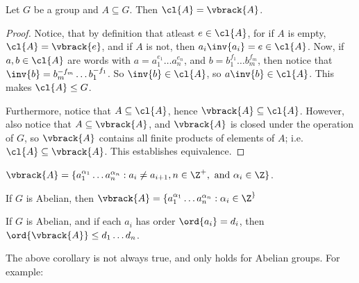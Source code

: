 \begin{lemma}\label{2.4.3}
    Let $G$ be a group and  $A \subseteq G$. Then  $\cl{A}=\vbrack{A}$.
\end{lemma}
\begin{proof}
    Notice, that by definition that atleast $e \in \cl{A}$, for if $A$ is empty,
    $\cl{A}=\vbrack{e}$, and if $A$ is not, then  $a_i\inv{a_i}=e \in \cl{A}$.
    Now, if $a,b \in \cl{A}$ are words with $a=a_1^{e_1} \dots a_n^{e_n}$, and
    $b=b_1^{f_1} \dots b_m^{f_m}$, then notice that $\inv{b}=b_m^{-f_m} \dots
    b_1^{-f_1}$. So $\inv{b} \in \cl{A}$, so $a\inv{b} \in \cl{A}$. This makes
    $\cl{A} \leq G$.

    Furthermore, notice that $A \subseteq \cl{A}$, hence $\vbrack{A} \subseteq
    \cl{A}$. However, also notice that $A \subseteq \vbrack{A}$, and
    $\vbrack{A}$ is closed under the operation of $G$, so  $\vbrack{A}$ contains
    all finite products of elements of $A$; i.e.  $\cl{A} \subseteq \vbrack{A}$.
    This establishes equivalence.
\end{proof}
\begin{corollary}
    $\vbrack{A}=\{a_1^{\alpha_1} \dots a_n^{\alpha_n} : a_i \neq a_{i+1}, n \in
    \Z^+, \text{ and } \alpha_i \in \Z\}$.
\end{corollary}
\begin{corollary}
    If $G$ is Abelian, then  $\vbrack{A}=\{a_1^{\alpha_1} \dots a_n^{\alpha_n} :
    \alpha_i \in \Z^\}$
\end{corollary}
\begin{corollary}
    If $G$ is Abelian, and if each  $a_i$ has order  $\ord{a_i}=d_i$, then
    $\ord{\vbrack{A}} \leq d_1 \dots d_n$.
\end{corollary}

The above corollary is not always true, and only holds for Abelian groups. For
example:

